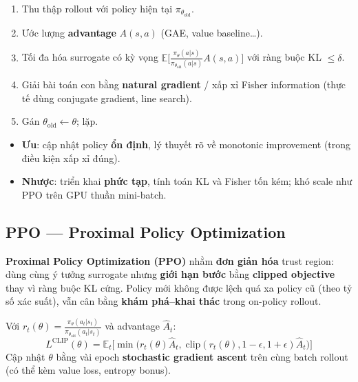\begin{phuongphap}[title={Ý tưởng thuật toán TRPO}]
\begin{enumerate}
  \item Thu thập rollout với policy hiện tại $\pi_{\theta_{\text{old}}}$.
  \item Ước lượng \textbf{advantage} $A(s,a)$ (GAE, value baseline\ldots).
  \item Tối đa hóa surrogate có kỳ vọng $\mathbb{E}\big[\frac{\pi_\theta(a|s)}{\pi_{\theta_{\text{old}}}(a|s)} A(s,a)\big]$ với ràng buộc KL $\leq \delta$.
  \item Giải bài toán con bằng \textbf{natural gradient} / xấp xỉ Fisher information (thực tế dùng conjugate gradient, line search).
  \item Gán $\theta_{\text{old}} \leftarrow \theta$; lặp.
\end{enumerate}
\end{phuongphap}

\begin{tinhchat}[title={Ưu và nhược TRPO}]
\begin{itemize}
  \item \textbf{Ưu}: cập nhật policy \textbf{ổn định}, lý thuyết rõ về monotonic improvement (trong điều kiện xấp xỉ đúng).
  \item \textbf{Nhược}: triển khai \textbf{phức tạp}, tính toán KL và Fisher tốn kém; khó scale như PPO trên GPU thuần mini-batch.
\end{itemize}
\end{tinhchat}

\subsection{PPO --- Proximal Policy Optimization}

\begin{dinhnghia}[title={PPO}]
\textbf{Proximal Policy Optimization (PPO)} nhằm \textbf{đơn giản hóa} trust region: dùng cùng ý tưởng surrogate nhưng \textbf{giới hạn bước} bằng \textbf{clipped objective} thay vì ràng buộc KL cứng. Policy mới không được lệch quá xa policy cũ (theo tỷ số xác suất), vẫn cân bằng \textbf{khám phá--khai thác} trong on-policy rollout.
\end{dinhnghia}

\begin{phuongphap}[title={target clipped (PPO-clip)}]
Với $r_t(\theta) = \frac{\pi_\theta(a_t|s_t)}{\pi_{\theta_{\text{old}}}(a_t|s_t)}$ và advantage $\hat{A}_t$:
\[
L^{\mathrm{CLIP}}(\theta) = \mathbb{E}_t\Big[\min\big(r_t(\theta)\hat{A}_t,\; \mathrm{clip}(r_t(\theta), 1-\epsilon, 1+\epsilon)\hat{A}_t\big)\Big]
\]
Cập nhật $\theta$ bằng vài epoch \textbf{stochastic gradient ascent} trên cùng batch rollout (có thể kèm value loss, entropy bonus).
\end{phuongphap}

